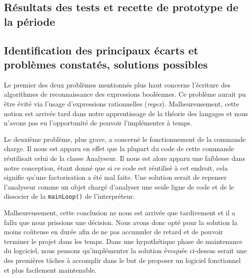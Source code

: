 \documentclass[12pt,a4paper,titlepage,openany, oneside]{report}
\begin{document}

    \subsection{Résultats des tests et recette de prototype de la période}


    \subsection{Identification des principaux écarts et problèmes constatés, solutions possibles}

    Le premier des deux problèmes mentionnés plus haut concerne l'écriture des
    algorithmes de reconnaissance des expressions booléennes. Ce problème aurait pu
    être évité via l'usage d'expressions rationnelles (\emph{regex}). Malheureusement,
    cette notion est arrivée tard dans notre apprentissage de la théorie des langages et
    nous n'avons pas eu l'opportunité de pouvoir l'implémenter à temps.

    Le deuxième problème, plus grave, a concerné le fonctionnement de la commande charge.
    Il nous est apparu en effet que la plupart du code de cette commande réutilisait celui
    de la classe Analyseur. Il nous est alors apparu une faiblesse dans notre conception,
    étant donné que si ce code est réutilisé à cet endroit, cela signifie qu'une
    factorisation a été mal faite. Une solution serait de repenser l'analyseur comme un
    objet chargé d'analyser une seule ligne de code et de le dissocier de la
    \verb|mainLoop()| de l'interpréteur.

    Malheureusement, cette conclusion ne nous est
    arrivée que tardivement et il a fallu que nous prissions une décision. Nous avons
    donc opté pour la solution la moins coûteuse en durée afin de ne pas accumuler de
    retard et de pouvoir terminer le projet dans les temps. Dans une hypothétique phase
    de maintenance du logciciel, nous pensons qu'implémenter la solution évoquée ci-dessus
    serait une des premières tâches à accomplir dans le but de proposer un logiciel
    fonctionnel et plus facilement maintenable.
\end{document}
